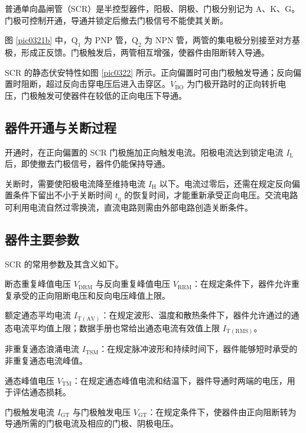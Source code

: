 普通单向晶闸管（SCR）是半控型器件，阳极、阴极、门极分别记为 $\mathrm A$、$\mathrm K$、$\mathrm G$。门极可控制开通，导通并锁定后撤去门极信号不能使其关断。


图 \ref{pic0321b} 中，$\mathrm Q_1$ 为 PNP 管，$\mathrm Q_2$ 为 NPN 管，两管的集电极分别接至对方基极，形成正反馈。门极触发后，两管相互增强，使器件由阻断转入导通。

SCR 的静态伏安特性如图 \ref{pic0322} 所示。正向偏置时可由门极触发导通；反向偏置时阻断，超过反向击穿电压后进入击穿区。$V_{\mathrm{BO}}$ 为门极开路时的正向转折电压，门极触发可使器件在较低的正向电压下导通。


\subsection{器件开通与关断过程}

开通时，在正向偏置的 SCR 门极施加正向触发电流。阳极电流达到锁定电流 $I_{\mathrm L}$ 后，即使撤去门极信号，器件仍能保持导通。

关断时，需要使阳极电流降至维持电流 $I_{\mathrm H}$ 以下。电流过零后，还需在规定反向偏置条件下留出不小于关断时间 $t_{\mathrm q}$ 的恢复时间，才能重新承受正向电压。交流电路可利用电流自然过零换流，直流电路则需由外部电路创造关断条件。

\newpage{}

\subsection{器件主要参数}

SCR 的常用参数及其含义如下。

断态重复峰值电压 $V_{\mathrm{DRM}}$ 与反向重复峰值电压 $V_{\mathrm{RRM}}$：在规定条件下，器件允许重复承受的正向阻断电压和反向电压峰值上限。

额定通态平均电流 $I_{\mathrm{T(AV)}}$：在规定波形、温度和散热条件下，器件允许通过的通态电流平均值上限；数据手册也常给出通态电流有效值上限 $I_{\mathrm{T(RMS)}}$。

非重复通态浪涌电流 $I_{\mathrm{TSM}}$：在规定脉冲波形和持续时间下，器件能够短时承受的非重复通态电流峰值。

通态峰值电压 $V_{\mathrm{TM}}$：在规定通态峰值电流和结温下，器件导通时两端的电压，用于评估通态损耗。

门极触发电流 $I_{\mathrm{GT}}$ 与门极触发电压 $V_{\mathrm{GT}}$：在规定条件下，使器件由正向阻断转为导通所需的门极电流及相应的门极、阴极电压。

